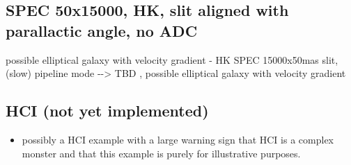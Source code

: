\subsection{SPEC 50x15000, HK, slit aligned with parallactic angle, no ADC%
  \label{spec-50x15000-hk-slit-aligned-with-parallactic-angle-no-adc}%
}

possible elliptical galaxy with velocity gradient
- HK SPEC 15000x50mas slit, (slow) pipeline mode -{}-> TBD , possible elliptical galaxy with velocity gradient


\subsection{HCI (not yet implemented)%
  \label{hci-not-yet-implemented}%
}

\begin{itemize}
\item possibly a HCI example with a large warning sign that HCI is a complex monster and that this example is purely for illustrative purposes.
\end{itemize}
